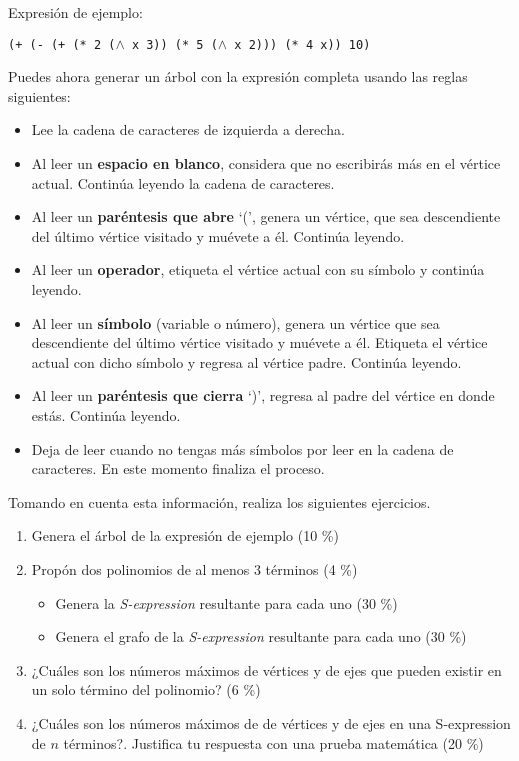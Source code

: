 \documentclass[spanish, 10pt]{article}
\begin{document}
Expresión de ejemplo:
\begin{tcolorbox}
	\begin{center}
		\texttt{(+ (- (+ (* 2 ($\wedge$ x 3)) (* 5 ($\wedge$ x 2))) (* 4 x)) 10)}
	\end{center}
\end{tcolorbox}

Puedes ahora generar un árbol con la expresión completa usando las reglas siguientes:

\begin{itemize}
	\item Lee la cadena de caracteres de izquierda a derecha.
	\item Al leer un \textbf{espacio en blanco}, considera que no escribirás más en el vértice actual. Continúa leyendo la cadena de caracteres.
	\item Al leer un \textbf{paréntesis que abre} `(', genera un vértice, que sea descendiente del último vértice visitado y muévete a él. Continúa leyendo.
	\item Al leer un \textbf{operador}, etiqueta el vértice actual con su símbolo y continúa leyendo.
	\item Al leer un \textbf{símbolo} (variable o número), genera un vértice que sea descendiente del último vértice visitado  y muévete a él. Etiqueta el vértice actual con dicho símbolo y regresa al vértice padre. Continúa leyendo.
	\item Al leer un \textbf{paréntesis que cierra} `)', regresa al padre del vértice en donde estás. Continúa leyendo.
	\item Deja de leer cuando no tengas más símbolos por leer en la cadena de caracteres. En este momento finaliza el proceso.
\end{itemize}

\pagebreak

Tomando en cuenta esta información, realiza los siguientes ejercicios.

\begin{enumerate}[label*=\alph*)]
	\item Genera el árbol de la expresión de ejemplo (10 \%)
	\item Propón dos polinomios de al menos 3 términos (4 \%)
	\begin{itemize}
		\item Genera la \textsl{S-expression} resultante para cada uno (30 \%)
		\item Genera el grafo de la \textsl{S-expression} resultante para cada uno (30 \%)
	\end{itemize}
	\item ¿Cuáles son los números máximos de vértices y de ejes que pueden existir en un solo término del polinomio? (6 \%)
	\item ¿Cuáles son los números máximos de de vértices y de ejes en una S-expression de $n$ términos?. Justifica tu respuesta con una prueba matemática (20 \%)
\end{enumerate}
\vspace{50ex}
\end{document}
